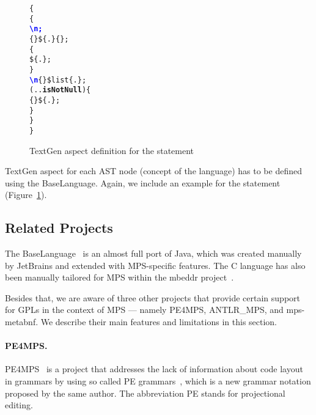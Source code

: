 \begin{figure}[ht]
\centering
\begin{alltt}
\small
{}  \{
   \{
     \textcolor{Blue}{\textbf{\textbackslash{}n;}}
     \{\} \$\{.\} \{\mpstgliteral{) \{}\};
     \{
       \$\{.\};
    \}
     \textcolor{Blue}{\textbf{\textbackslash{}n}} \{\mpstgliteral{\}}\} \$list\{.\};
     (..\textbf{isNotNull}) \{
       \{ \} \$\{.\};
    \}
  \}
\}
\end{alltt}
\caption{TextGen aspect definition for the  statement}
\label{fig:if_statement_textgen}
\end{figure}

TextGen aspect for each AST node (concept of the language) has to be defined using the BaseLanguage.
Again, we include an example for the  statement (Figure~\ref{fig:if_statement_textgen}).

\subsection{Related Projects}
\label{sect:RELATED}

The BaseLanguage~\cite{ref:BASELANG} is an almost full port of Java, which was created manually by JetBrains and extended with MPS-specific features.
The C language has also been manually tailored for MPS within the mbeddr project~\cite{ref:MBEDDR}.

Besides that, we are aware of three other projects that provide certain support for GPLs in the context of MPS --- namely PE4MPS, ANTLR{\_}MPS, and mps-metabnf.
We describe their main features and limitations in this section.

\paragraph{PE4MPS.}
PE4MPS~\cite{ref:PE4MPS} is a project that addresses the lack of information about code layout in grammars by using so called PE grammars~\cite{ref:PE}, which is a new grammar notation proposed by the same author.
The abbreviation PE stands for projectional editing.

